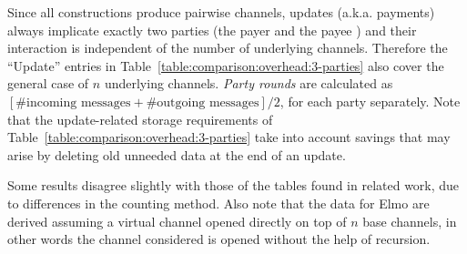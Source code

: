  Since all constructions produce pairwise channels, updates (a.k.a. payments)
  always implicate exactly two parties (the payer and the payee ) and
  their interaction is independent of the number of underlying channels.
  Therefore the ``Update'' entries in
  Table~\ref{table:comparison:overhead:3-parties} also cover the general case of
  $n$ underlying channels. \emph{Party rounds} are calculated as
  $[\#\text{incoming messages} + \#\text{outgoing messages}]/2$, for each party
  separately. Note that the update-related storage requirements of
  Table~\ref{table:comparison:overhead:3-parties} take into account savings that
  may arise by deleting old unneeded data at the end of an update. 

  Some results disagree slightly with those of the tables found in related work,
  due to differences in the counting method. Also note that the data for Elmo
  are derived assuming a virtual channel opened directly on top of $n$ base
  channels, in other words the channel considered is opened without the help of
  recursion.

